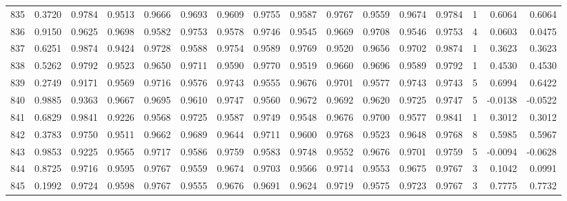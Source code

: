 \begin{tabular}{lrrrrrrrrrrrrrrr}
835 &      0.3720 &  0.9784 &  0.9513 &  0.9666 &  0.9693 &  0.9609 &  0.9755 &  0.9587 &  0.9767 &  0.9559 &   0.9674 &     0.9784 &      1 &                    0.6064 &                     0.6064 \\
836 &      0.9150 &  0.9625 &  0.9698 &  0.9582 &  0.9753 &  0.9578 &  0.9746 &  0.9545 &  0.9669 &  0.9708 &   0.9546 &     0.9753 &      4 &                    0.0603 &                     0.0475 \\
837 &      0.6251 &  0.9874 &  0.9424 &  0.9728 &  0.9588 &  0.9754 &  0.9589 &  0.9769 &  0.9520 &  0.9656 &   0.9702 &     0.9874 &      1 &                    0.3623 &                     0.3623 \\
838 &      0.5262 &  0.9792 &  0.9523 &  0.9650 &  0.9711 &  0.9590 &  0.9770 &  0.9519 &  0.9660 &  0.9696 &   0.9589 &     0.9792 &      1 &                    0.4530 &                     0.4530 \\
839 &      0.2749 &  0.9171 &  0.9569 &  0.9716 &  0.9576 &  0.9743 &  0.9555 &  0.9676 &  0.9701 &  0.9577 &   0.9743 &     0.9743 &      5 &                    0.6994 &                     0.6422 \\
840 &      0.9885 &  0.9363 &  0.9667 &  0.9695 &  0.9610 &  0.9747 &  0.9560 &  0.9672 &  0.9692 &  0.9620 &   0.9725 &     0.9747 &      5 &                   -0.0138 &                    -0.0522 \\
841 &      0.6829 &  0.9841 &  0.9226 &  0.9568 &  0.9725 &  0.9587 &  0.9749 &  0.9548 &  0.9676 &  0.9700 &   0.9577 &     0.9841 &      1 &                    0.3012 &                     0.3012 \\
842 &      0.3783 &  0.9750 &  0.9511 &  0.9662 &  0.9689 &  0.9644 &  0.9711 &  0.9600 &  0.9768 &  0.9523 &   0.9648 &     0.9768 &      8 &                    0.5985 &                     0.5967 \\
843 &      0.9853 &  0.9225 &  0.9565 &  0.9717 &  0.9586 &  0.9759 &  0.9583 &  0.9748 &  0.9552 &  0.9676 &   0.9701 &     0.9759 &      5 &                   -0.0094 &                    -0.0628 \\
844 &      0.8725 &  0.9716 &  0.9595 &  0.9767 &  0.9559 &  0.9674 &  0.9703 &  0.9566 &  0.9714 &  0.9553 &   0.9675 &     0.9767 &      3 &                    0.1042 &                     0.0991 \\
845 &      0.1992 &  0.9724 &  0.9598 &  0.9767 &  0.9555 &  0.9676 &  0.9691 &  0.9624 &  0.9719 &  0.9575 &   0.9723 &     0.9767 &      3 &                    0.7775 &                     0.7732 \\

\end{tabular}
